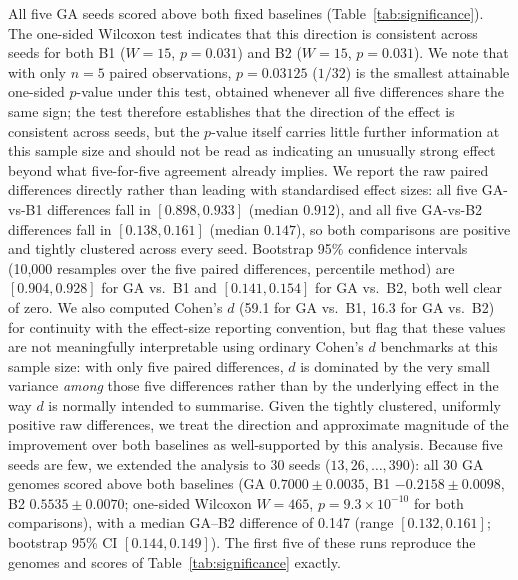 \documentclass[mathematics,article,submit,xetex,moreauthors]{Definitions/mdpi}
\begin{document}
All five GA seeds scored above both fixed baselines
(Table~\ref{tab:significance}). The one-sided Wilcoxon test indicates that
this direction is consistent across seeds for both B1 ($W = 15$,
$p = 0.031$) and B2 ($W = 15$, $p = 0.031$). We note that with only $n=5$
paired observations, $p=0.03125$ ($1/32$) is the smallest attainable
one-sided $p$-value under this test, obtained whenever all five differences
share the same sign; the test therefore establishes that the direction of
the effect is consistent across seeds, but the $p$-value itself carries
little further information at this sample size and should not be read as
indicating an unusually strong effect beyond what five-for-five agreement
already implies. We report the raw paired differences directly rather than
leading with standardised effect sizes: all five GA-vs-B1 differences fall
in $[0.898, 0.933]$ (median $0.912$), and all five GA-vs-B2 differences
fall in $[0.138, 0.161]$ (median $0.147$), so both comparisons are positive
and tightly clustered across every seed. Bootstrap 95\% confidence
intervals (10{,}000 resamples over the five paired differences, percentile
method) are $[0.904, 0.928]$ for GA vs.\ B1 and $[0.141, 0.154]$ for GA
vs.\ B2, both well clear of zero. We also computed Cohen's $d$ (59.1 for
GA vs.\ B1, 16.3 for GA vs.\ B2) for continuity with the effect-size
reporting convention, but flag that these values are not meaningfully
interpretable using ordinary Cohen's $d$ benchmarks at this sample size:
with only five paired differences, $d$ is dominated by the very small
variance \emph{among} those five differences rather than by the
underlying effect in the way $d$ is normally intended to summarise. Given the tightly
clustered, uniformly positive raw differences, we treat the direction and
approximate magnitude of the improvement over both baselines as
well-supported by this analysis. Because five seeds are few, we extended the
analysis to 30 seeds ($13, 26, \ldots, 390$): all 30 GA genomes scored above both
baselines (GA $0.7000 \pm 0.0035$, B1 $-0.2158 \pm 0.0098$, B2
$0.5535 \pm 0.0070$; one-sided Wilcoxon $W=465$, $p=9.3\times10^{-10}$ for both
comparisons), with a median GA--B2 difference of 0.147 (range
$[0.132, 0.161]$; bootstrap 95\% CI $[0.144, 0.149]$). The first five of these
runs reproduce the genomes and scores of Table~\ref{tab:significance} exactly.
\end{document}
